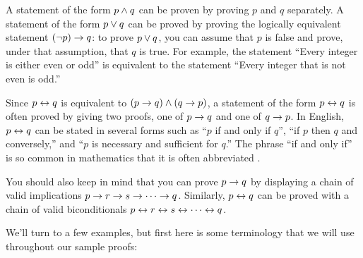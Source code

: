 A statement of the form $p\wedge q$ can be proven by proving
$p$ and $q$ separately.  A statement of the form $p\vee q$
can be proved by proving the logically equivalent statement
$(\lnot p)\rightarrow q$: to prove
$p\vee q$, you can assume that $p$ is false and prove, under
that assumption, that $q$ is true.  For example, the
statement ``Every integer is either even or odd'' is
equivalent to the statement ``Every integer that is not even
is odd.''

Since $p\leftrightarrow q$ is equivalent
to $(p\rightarrow q)\wedge(q\rightarrow p)$, a statement of the form $p\leftrightarrow q$
is often proved by giving two proofs, one of
$p\rightarrow q$ and one of $q\rightarrow p$.  In English,
$p\leftrightarrow q$ can be stated in several forms such as
``$p$ if and only if $q$'', ``if $p$ then $q$ and conversely,''
and ``$p$ is necessary and sufficient for $q$.''  The phrase
``if and only if'' is so common in mathematics that it is
often abbreviated .

You should also keep in mind that you can prove $p\rightarrow q$
by displaying a chain of valid implications $p\rightarrow r\rightarrow s\rightarrow \cdots\rightarrow q$.
Similarly, $p\leftrightarrow q$ can be proved with a chain of valid
biconditionals $p\leftrightarrow r\leftrightarrow s\leftrightarrow \cdots\leftrightarrow q$.

\medbreak

We'll turn to a few examples, but first  
here is some terminology that we will use throughout our sample proofs:

